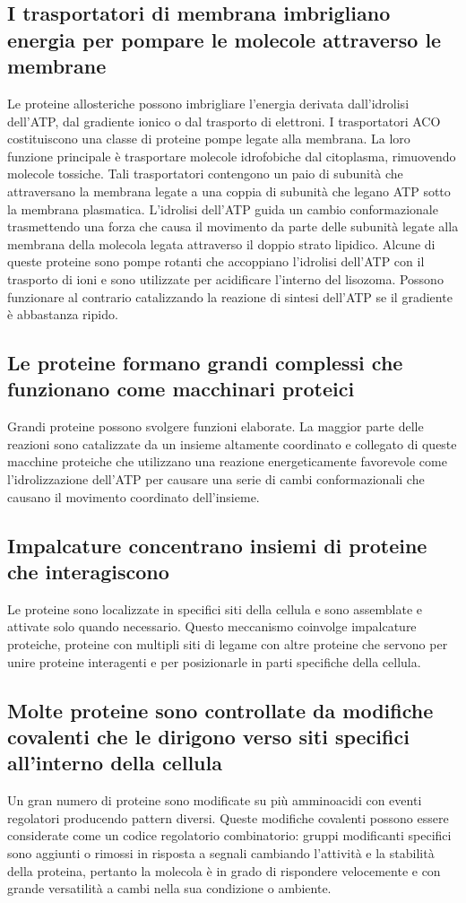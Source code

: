 \subsection{I trasportatori di membrana imbrigliano energia per pompare le molecole attraverso le membrane}
Le proteine allosteriche possono imbrigliare l'energia derivata dall'idrolisi dell'ATP, dal gradiente ionico o dal trasporto di elettroni. I trasportatori ACO costituiscono una classe
di proteine pompe legate alla membrana. La loro funzione principale \`e trasportare molecole idrofobiche dal citoplasma, rimuovendo molecole tossiche. Tali trasportatori contengono un
paio di subunit\`a che attraversano la membrana legate a una coppia di subunit\`a che legano ATP sotto la membrana plasmatica. L'idrolisi dell'ATP guida un cambio conformazionale
trasmettendo una forza che causa il movimento da parte delle subunit\`a legate alla membrana della molecola legata attraverso il doppio strato lipidico. Alcune di queste proteine 
sono pompe rotanti che accoppiano l'idrolisi dell'ATP con il trasporto di ioni  e sono utilizzate per acidificare l'interno del lisozoma. Possono funzionare al contrario 
catalizzando la reazione di sintesi dell'ATP se il gradiente \`e abbastanza ripido. 
\subsection{Le proteine formano grandi complessi che funzionano come macchinari proteici}
Grandi proteine possono svolgere funzioni elaborate. La maggior parte delle reazioni sono catalizzate da un insieme altamente coordinato e collegato di queste macchine proteiche che
utilizzano una reazione energeticamente favorevole come l'idrolizzazione dell'ATP per causare una serie di cambi conformazionali che causano il movimento coordinato dell'insieme. 
\subsection{Impalcature concentrano insiemi di proteine che interagiscono}
Le proteine sono localizzate in specifici siti della cellula e sono assemblate e attivate solo quando necessario. Questo meccanismo coinvolge impalcature proteiche, proteine con 
multipli siti di legame con altre proteine che servono per unire proteine interagenti e per posizionarle in parti specifiche della cellula. 
\subsection{Molte proteine sono controllate da modifiche covalenti che le dirigono verso siti specifici all'interno della cellula}
Un gran numero di proteine sono modificate su pi\`u amminoacidi con eventi regolatori producendo pattern diversi. Queste modifiche covalenti possono essere considerate come un codice
regolatorio combinatorio: gruppi modificanti specifici sono aggiunti o rimossi in risposta a segnali cambiando l'attivit\`a e la stabilit\`a della proteina, pertanto la molecola \`e in
grado di rispondere velocemente e con grande versatilit\`a a cambi nella sua condizione o ambiente.
